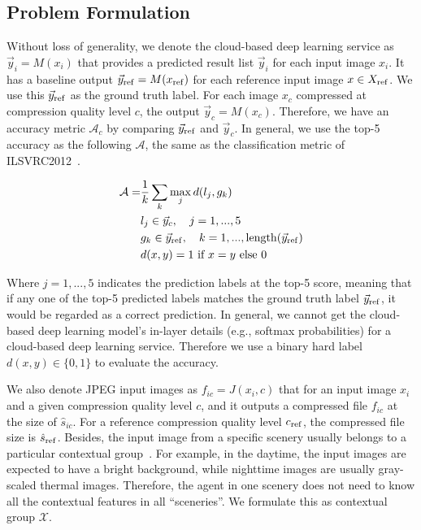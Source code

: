 \vspace{-1em}

\subsection{Problem Formulation}
\label{subsec: formulation}
Without loss of generality, we denote the cloud-based deep learning service as $ \vec{y}_i = M(x_i) $ that provides a predicted result list $ \vec{y}_i $ for each input image $ x_i $. It has a baseline output $ \vec{y}_{\rm ref} = M(x_{\rm ref}) $ for each reference input image $ x \in X_{\rm ref} $. We use this $ \vec{y}_{\rm ref} $ as the ground truth label. For each image $ x_c $ compressed at compression quality level $ c $, the output $ \vec{y}_c = M(x_c) $. Therefore, we have an accuracy metric $ \mathcal{A}_c $ by comparing $ \vec{y}_{\rm ref} $ and $ \vec{y}_c $. In general, we use the top-5 accuracy as the following $ \mathcal{A} $, the same as the classification metric of ILSVRC2012~\cite{ILSVRC12}.

\begin{align}
\mathcal{A} =& \frac{1}{k} \sum_{k}\max_jd(l_j, g_k) \\
& l_j \in \vec{y}_c, \quad j=1,...,5 \\
& g_k \in \vec{y}_{\rm ref}, \quad k=1, ..., {\rm length}(\vec{y}_{\rm ref}) \\
& d(x, y) = 1 \ \text{if} \ x=y  \ \text{else} \ 0 
\end{align}

Where $ j = 1,...,5 $ indicates the prediction labels at the top-5 score, meaning that if any one of the top-5 predicted labels matches the ground truth label $ \vec{y}_{\rm ref} $, it would be regarded as a correct prediction. In general, we cannot get the cloud-based deep learning model's in-layer details (e.g., softmax probabilities) for a cloud-based deep learning service. Therefore we use a binary hard label $ d(x, y) \in \{0, 1\} $ to evaluate the accuracy. %

We also denote JPEG input images as $ f_{ic} = J(x_i, c) $ that for an input image $ x_i $ and a given compression quality level $ c $, and it outputs a compressed file $ f_{ic} $ at the size of {\color{revise2} $ \hat{s}_{ic} $}. For a reference compression quality level $ c_{\rm ref} $, the compressed file size is {\color{revise2} $ \hat{s}_{\rm ref} $}. Besides, the input image from a specific scenery usually belongs to a particular contextual group~\cite{mcdnn}. For example, in the daytime, the input images are expected to have a bright background, while nighttime images are usually gray-scaled thermal images. Therefore, the agent in one scenery does not need to know all the contextual features in all ``sceneries''. We formulate this as contextual group $ \mathcal{X} $.

